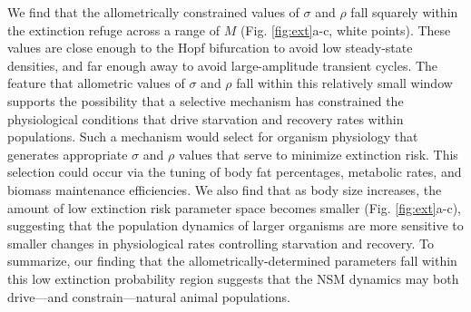 \documentclass[twocolumn,preprintnumbers,amsmath,amssymb,superscriptaddress]{revtex4}
\begin{document}
\begin{bibunit}[unsrt]
We find that the allometrically constrained values of $\sigma$ and $\rho$ fall squarely within the extinction refuge across a range of $M$ (Fig. \ref{fig:ext}a-c, white points).
These values are close enough to the Hopf bifurcation to avoid low steady-state densities, and far enough away to avoid large-amplitude transient cycles.
The feature that allometric values of $\sigma$ and $\rho$ fall within this relatively small window supports the possibility that a selective mechanism has constrained the physiological conditions that drive starvation and recovery rates within populations.
Such a mechanism would select for organism physiology that generates appropriate $\sigma$ and $\rho$ values that serve to minimize extinction risk.
This selection could occur via the tuning of body fat percentages, metabolic rates, and biomass maintenance efficiencies.
We also find that as body size increases, the amount of low extinction risk parameter space becomes smaller (Fig. \ref{fig:ext}a-c), suggesting that the population dynamics of larger organisms are more sensitive to smaller changes in physiological rates controlling starvation and recovery.
To summarize, our finding that the allometrically-determined parameters fall within this low extinction probability region suggests that the NSM dynamics may both drive---and constrain---natural animal populations.\\







\end{bibunit}
\end{document}
